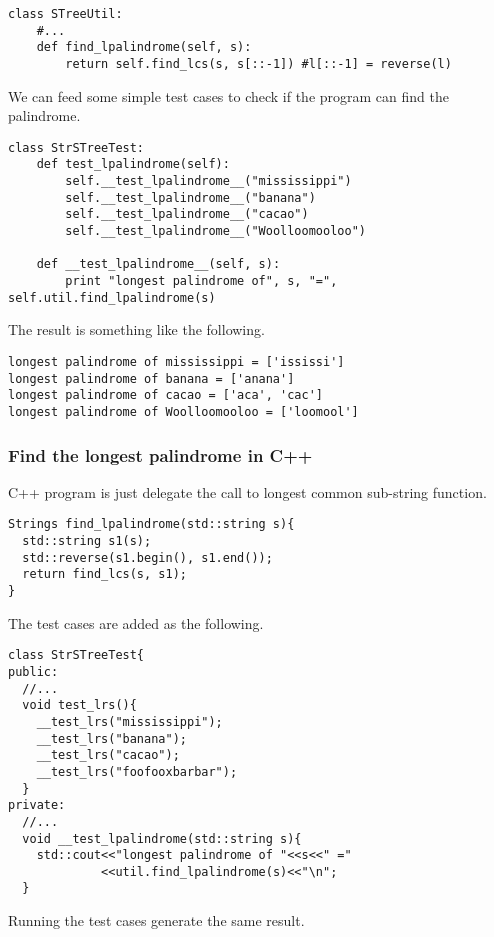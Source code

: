 \documentclass{article}
\begin{document}
\begin{lstlisting}
class STreeUtil:
    #...
    def find_lpalindrome(self, s):
        return self.find_lcs(s, s[::-1]) #l[::-1] = reverse(l)
\end{lstlisting}

We can feed some simple test cases to check if the program can
find the palindrome.

\begin{lstlisting}
class StrSTreeTest:
    def test_lpalindrome(self):
        self.__test_lpalindrome__("mississippi")
        self.__test_lpalindrome__("banana")
        self.__test_lpalindrome__("cacao")
        self.__test_lpalindrome__("Woolloomooloo")

    def __test_lpalindrome__(self, s):
        print "longest palindrome of", s, "=", self.util.find_lpalindrome(s)
\end{lstlisting}

The result is something like the following.

\begin{verbatim}
longest palindrome of mississippi = ['ississi']
longest palindrome of banana = ['anana']
longest palindrome of cacao = ['aca', 'cac']
longest palindrome of Woolloomooloo = ['loomool']
\end{verbatim}

\subsubsection*{Find the longest palindrome in C++}
C++ program is just delegate the call to longest common sub-string
function.

\begin{lstlisting}
Strings find_lpalindrome(std::string s){
  std::string s1(s);
  std::reverse(s1.begin(), s1.end());
  return find_lcs(s, s1);
}
\end{lstlisting}

The test cases are added as the following.

\begin{lstlisting}
class StrSTreeTest{
public:
  //...
  void test_lrs(){
    __test_lrs("mississippi");
    __test_lrs("banana");
    __test_lrs("cacao");
    __test_lrs("foofooxbarbar");
  }
private:
  //...
  void __test_lpalindrome(std::string s){
    std::cout<<"longest palindrome of "<<s<<" ="
             <<util.find_lpalindrome(s)<<"\n";
  }
\end{lstlisting}

Running the test cases generate the same result.
\end{document}
